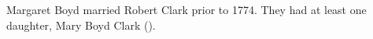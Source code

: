 
Margaret Boyd married Robert Clark prior to 1774. They had at least one daughter, Mary Boyd Clark ().
